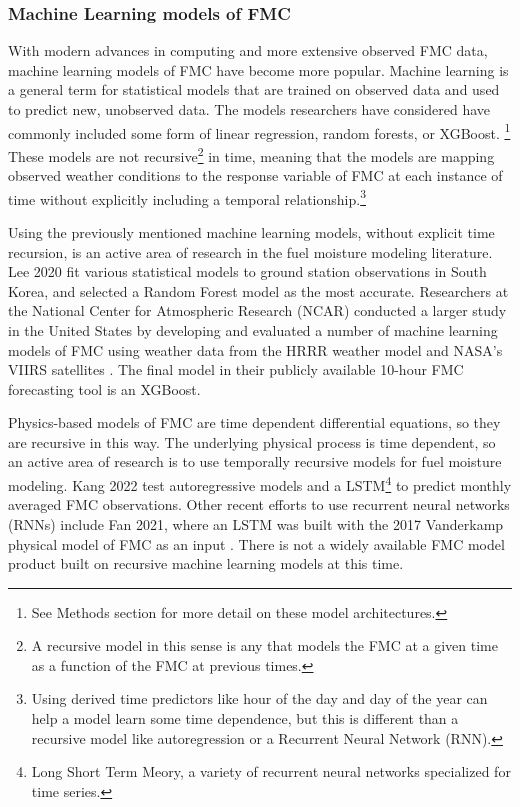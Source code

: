 \documentclass[11pt]{article}%
\begin{document}
\subsubsection{Machine Learning models of FMC}

With modern advances in computing and more extensive observed FMC data, machine learning models of FMC have become more popular. Machine learning is a general term for statistical models that are trained on observed data and used to predict new, unobserved data. The models researchers have considered have commonly included some form of linear regression, random forests, or XGBoost. \footnote{See Methods section for more detail on these model architectures.} These models are not recursive\footnote{A recursive model in this sense is any that models the FMC at a given time as a function of the FMC at previous times.} in time, meaning that the models are mapping observed weather conditions to the response variable of FMC at each instance of time without explicitly including a temporal relationship.\footnote{Using derived time predictors like hour of the day and day of the year can help a model learn some time dependence, but this is different than a recursive model like autoregression or a Recurrent Neural Network (RNN).} 


Using the previously mentioned machine learning models, without explicit time recursion, is an active area of research in the fuel moisture modeling literature. Lee 2020 fit various statistical models to ground station observations in South Korea, and selected a Random Forest model as the most accurate. \cite{Lee-2020-EFM} Researchers at the National Center for Atmospheric Research (NCAR) conducted a larger study in the United States by developing and evaluated a number of machine learning models of FMC using weather data from the HRRR weather model and NASA's VIIRS satellites \cite{McCandless-2020-EWS}\cite{Schreck-2023-MLV}. The final model in their publicly available 10-hour FMC forecasting tool is an XGBoost. 

Physics-based models of FMC are time dependent differential equations, so they are recursive in this way. The underlying physical process is time dependent, so an active area of research is to use temporally recursive models for fuel moisture modeling. Kang 2022 test autoregressive models and a LSTM\footnote{Long Short Term Meory, a variety of recurrent neural networks specialized for time series.} to predict monthly averaged FMC observations. \cite{Kang-2022-FMC} Other recent efforts to use recurrent neural networks (RNNs) include Fan 2021, where an LSTM was built with the 2017 Vanderkamp physical model of FMC as an input \cite{Fan-2021-PGD}. There is not a widely available FMC model product built on recursive machine learning models at this time.
\end{document}
